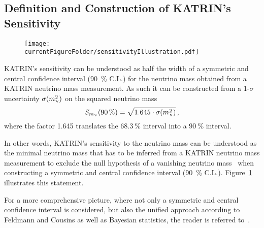 \subsection{Definition and Construction of KATRIN's Sensitivity}
\label{sec:statMethodsSensitivtyDef}
\begin{figure}
	\centering
	\texttt{[image: \\currentFigureFolder/sensitivityIllustration.pdf]}
	\label{fig:statMethodsSensitivity}
\end{figure}

KATRIN's sensitivity can be understood as half the width of a symmetric and central confidence interval (\SI{90}{\percent} C.L.) for the neutrino mass obtained from a KATRIN neutrino mass measurement. As such it can be constructed from a 1-$\sigma$ uncertainty $\sigma(m_\upnu^2)$ on the squared neutrino mass~\cite{Angrik:2005ep}
\begin{equation}
\label{eq:statMethodsSensitivity}
S_{m_\upnu}(\SI{90}{\percent}) = \sqrt{1.645\cdot\sigma(m_\upnu^2)}
\text{\,,}
\end{equation}
where the factor 1.645 translates the $\SI{68.3}{\percent}$ interval into a $\SI{90}{\percent}$ interval.

In other words, KATRIN's sensitivity to the neutrino mass can be understood as the minimal neutrino mass that has to be inferred from a KATRIN neutrino mass measurement to exclude the null hypothesis of a vanishing neutrino mass~\cite{Kleesiek2014} when constructing a symmetric and central confidence interval (\SI{90}{\percent} C.L.). Figure~\ref{fig:statMethodsSensitivity} illustrates this statement.

For a more comprehensive picture, where not only a symmetric and central confidence interval is considered, but also the unified approach according to Feldmann and Cousins as well as Bayesian statistics, the reader is referred to~\cite{Kleesiek2019}.

